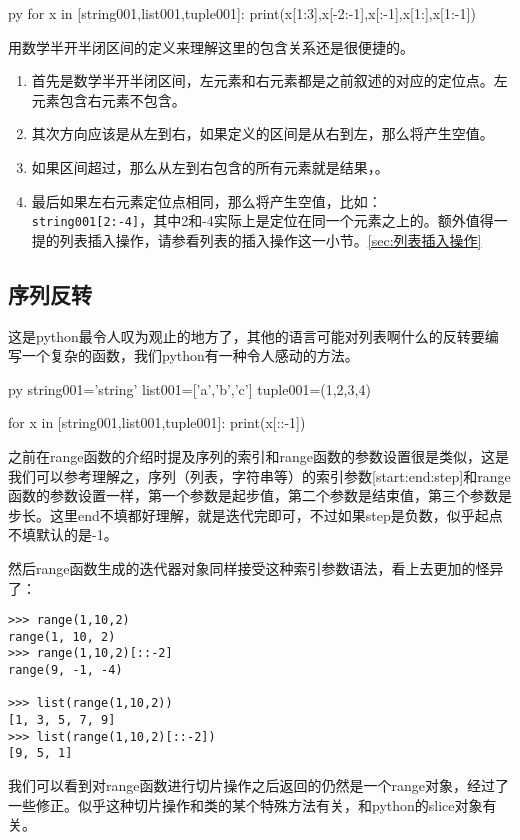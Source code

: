 \documentclass[12pt,oneside]{book}
\begin{document}
\begin{common-format}
\begin{xverbatim}[129]{py}
for x in [string001,list001,tuple001]:
    print(x[1:3],x[-2:-1],x[:-1],x[1:],x[1:-1])
\end{xverbatim}
用数学半开半闭区间的定义来理解这里的包含关系还是很便捷的。
\begin{enumerate}
\item 首先是数学半开半闭区间，左元素和右元素都是之前叙述的对应的定位点。左元素包含右元素不包含。
\item 其次方向应该是从左到右，如果定义的区间是从右到左，那么将产生空值。
\item 如果区间超过，那么从左到右包含的所有元素就是结果，。
\item 最后如果左右元素定位点相同，那么将产生空值，比如：\\
\verb+string001[2:-4]+，其中2和-4实际上是定位在同一个元素之上的。额外值得一提的列表插入操作，请参看列表的插入操作这一小节。\ref{sec:列表插入操作}
\end{enumerate}


\subsection{序列反转}
这是python最令人叹为观止的地方了，其他的语言可能对列表啊什么的反转要编写一个复杂的函数，我们python有一种令人感动的方法。

\begin{xverbatim}[129]{py}
string001='string'
list001=['a','b','c']
tuple001=(1,2,3,4)

for x in [string001,list001,tuple001]:
    print(x[::-1])
\end{xverbatim}


之前在range函数的介绍时提及序列的索引和range函数的参数设置很是类似，这是我们可以参考理解之，序列（列表，字符串等）的索引参数[start:end:step]和range函数的参数设置一样，第一个参数是起步值，第二个参数是结束值，第三个参数是步长。这里end不填都好理解，就是迭代完即可，不过如果step是负数，似乎起点不填默认的是-1。

然后range函数生成的迭代器对象同样接受这种索引参数语法，看上去更加的怪异了：
\begin{Verbatim}
>>> range(1,10,2)
range(1, 10, 2)
>>> range(1,10,2)[::-2]
range(9, -1, -4)

>>> list(range(1,10,2))
[1, 3, 5, 7, 9]
>>> list(range(1,10,2)[::-2])
[9, 5, 1]
\end{Verbatim}
我们可以看到对range函数进行切片操作之后返回的仍然是一个range对象，经过了一些修正。似乎这种切片操作和类的某个特殊方法有关，和python的slice对象有关。



\end{common-format}
\end{document}
